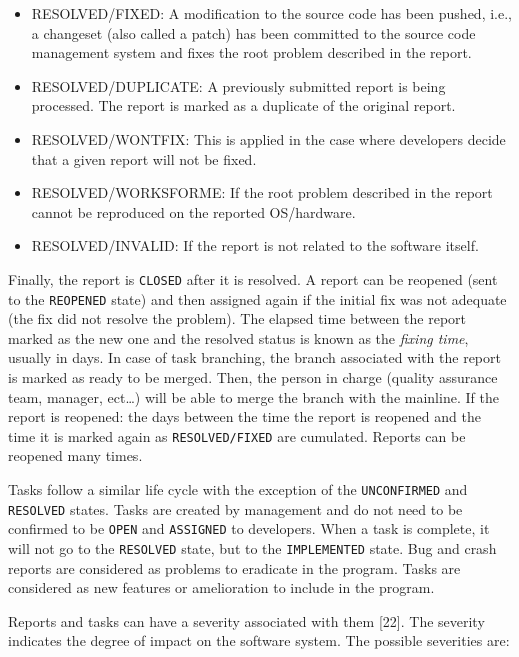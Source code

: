 \documentclass[12pt]{report}
\providecommand{\tightlist}{%
  \setlength{\itemsep}{0pt}\setlength{\parskip}{0pt}}
\begin{document}
\begin{itemize}
\tightlist
\item
  RESOLVED/FIXED: A modification to the source code has been pushed,
  i.e., a changeset (also called a patch) has been committed to the
  source code management system and fixes the root problem described in
  the report.
\item
  RESOLVED/DUPLICATE: A previously submitted report is being processed.
  The report is marked as a duplicate of the original report.
\item
  RESOLVED/WONTFIX: This is applied in the case where developers decide
  that a given report will not be fixed.
\item
  RESOLVED/WORKSFORME: If the root problem described in the report
  cannot be reproduced on the reported OS/hardware.
\item
  RESOLVED/INVALID: If the report is not related to the software itself.
\end{itemize}

Finally, the report is \lstinline!CLOSED! after it is resolved. A report
can be reopened (sent to the \lstinline!REOPENED! state) and then
assigned again if the initial fix was not adequate (the fix did not
resolve the problem). The elapsed time between the report marked as the
new one and the resolved status is known as the \emph{fixing time},
usually in days. In case of task branching, the branch associated with
the report is marked as ready to be merged. Then, the person in charge
(quality assurance team, manager, ect\ldots{}) will be able to merge the
branch with the mainline. If the report is reopened: the days between
the time the report is reopened and the time it is marked again as
\lstinline!RESOLVED/FIXED! are cumulated. Reports can be reopened many
times.

Tasks follow a similar life cycle with the exception of the
\lstinline!UNCONFIRMED! and \lstinline!RESOLVED! states. Tasks are
created by management and do not need to be confirmed to be
\lstinline!OPEN! and \lstinline!ASSIGNED! to developers. When a task is
complete, it will not go to the \lstinline!RESOLVED! state, but to the
\lstinline!IMPLEMENTED! state. Bug and crash reports are considered as
problems to eradicate in the program. Tasks are considered as new
features or amelioration to include in the program.

Reports and tasks can have a severity associated with them {[}22{]}. The
severity indicates the degree of impact on the software system. The
possible severities are:
\end{document}

